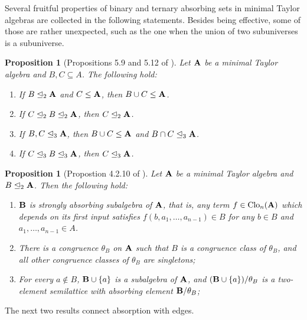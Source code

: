\documentclass[11pt]{amsart}
\newcommand{\m}[1]{\mathbf{\uppercase{#1}}}
\newtheorem{prp}[thm]{Proposition}
\theoremstyle{definition}
\theoremstyle{remark}
\theoremstyle{plain}
\begin{document}
Several fruitful properties of binary and ternary absorbing sets in minimal Taylor algebras are collected in the following statements. Besides being effective, some of those are rather unexpected, such as the one when the union of two subuniverses is a subuniverse.  
\begin{prp}[Propositions 5.9 and 5.12 of \cite{dreamteam}]\label{composition}
Let $\m a$ be a minimal Taylor algebra and $B,C\subseteq A$. The following hold:
\begin{enumerate}
\item[$\mathrm{(1)}$] If $B\trianglelefteq_2\m a$ and $C\leq \m a$, then $B\cup C\leq \m a$.
\item[$\mathrm{(2)}$] If $C\trianglelefteq_2 B\trianglelefteq_2 \m a$, then $C\trianglelefteq_2 \m a$.
\item[$\mathrm{(3)}$] If $B,C\trianglelefteq_3 \m a$, then $B\cup C\leq \m a$ and $B\cap C\trianglelefteq_3 \m a$.
\item[$\mathrm{(4)}$] If $C\trianglelefteq_3 B\trianglelefteq_3 \m a$, then $C\trianglelefteq_3 \m a$.
\end{enumerate}
\end{prp}

\begin{prp}[Propostion 4.2.10 of \cite{Zebnotes}]\label{bradybinaryprop}
Let $\m a$ be a minimal Taylor algebra and $B\trianglelefteq_2\m a$. Then the following hold:
\begin{enumerate}
    \item[$\mathrm{(1)}$] $\m B$ is strongly absorbing subalgebra of $\m a$, that is, any term $f\in\mathrm{Clo}_n({\m A})$ which depends on its first input satisfies $f(b,a_1,\dots,a_{n-1})\in B$ for any $b\in B$ and $a_1,\dots,a_{n-1}\in A$.

    \item[$\mathrm{(2)}$] There is a congruence $\theta_B$ on $\m a$ such that $B$ is a congruence class of $\theta_B$, and all other congruence classes of $\theta_B$ are singletons;
    \item[$\mathrm{(3)}$] For every $a\notin B$, $\m b\cup \{a\}$ is a subalgebra of $\m a$, and $(\m b\cup \{a\})/\theta_B $ is a two-element semilattice with absorbing element $\m b/\theta_B$;
\end{enumerate}
\end{prp}

The next two results connect absorption with edges.
\end{document}
